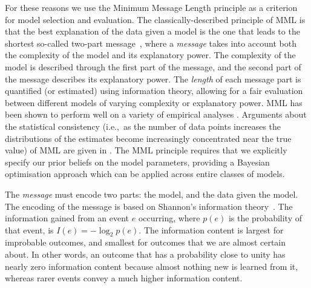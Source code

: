 \documentclass[twocolumn]{aastex62}
\begin{document}
For these reasons we use the Minimum Message Length \citep[MML;][]{Wallace:2005}
principle as a criterion for model selection and evaluation. 
The classically-described principle of MML is that the best explanation of the
data given a model is the one that leads to the shortest so-called two-part message~\citep{Wallace:2005}, 
where a \textit{message} takes into account both the complexity of the model 
and its explanatory power. The complexity of the model is described through
the first part of the message, and the second part of the message describes
its explanatory power. The \emph{length} of each message part is quantified
(or estimated) using information theory, allowing for a fair evaluation between
different models of varying complexity or explanatory power. MML has been 
shown to perform well on a variety of empirical analyses 
\citep[see, e.g.,][]{WallaceDowe1994b,viswanathan1999finding,EdwardsDowe1998,WallaceDowe2000,fitzgibbon2004minimum,Wallace:2005,dowe2007bayes,Dowe2008a,Dowe2011a}.
Arguments about the statistical consistency (i.e.,~as the number of data 
points increases the distributions of the estimates become increasingly 
concentrated near the true value) of MML are given in \citet{DoweWallace1997a,Dowe2011a}.
The MML principle requires that we explicitly specify our prior beliefs on the
model parameters, providing a Bayesian optimisation approach which can be
applied across entire classes of models.

The \textit{message} must encode two parts: the model, and the data given the
model. The encoding of the message is based on Shannon's information theory~\citep{Shannon:1948}. 
The information gained from an event $e$ occurring, where $p(e)$ is the
probability of that event, is $I(e) = -\log_{2}{p(e)}$. The information content
is largest for improbable outcomes, and smallest for outcomes that we are 
almost certain about. In other words, an outcome that has a probability close
to unity has nearly zero information content because almost nothing new is learned from it,
whereas rarer events convey a much higher information content. 
\end{document}
